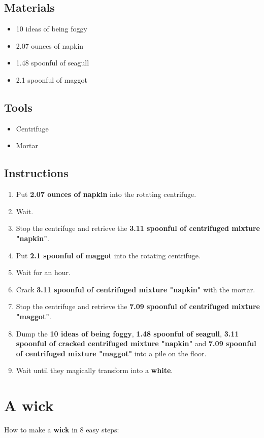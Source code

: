 \documentclass{article}
\begin{document}
\subsection{Materials}\begin{itemize}
\item 
10 ideas of being foggy
\item 
2.07 ounces of napkin
\item 
1.48 spoonful of seagull
\item 
2.1 spoonful of maggot
\end{itemize}
\subsection{Tools}\begin{itemize}
\item 
Centrifuge
\item 
Mortar
\end{itemize}
\subsection{Instructions}\begin{enumerate}
\item 
Put \textbf{2.07 ounces of napkin} into the rotating centrifuge.
\item 
Wait.
\item 
Stop the centrifuge and retrieve the \textbf{3.11 spoonful of centrifuged mixture "napkin"}.
\item 
Put \textbf{2.1 spoonful of maggot} into the rotating centrifuge.
\item 
Wait for an hour.
\item 
Crack \textbf{3.11 spoonful of centrifuged mixture "napkin"} with the mortar.
\item 
Stop the centrifuge and retrieve the \textbf{7.09 spoonful of centrifuged mixture "maggot"}.
\item 
Dump the \textbf{10 ideas of being foggy}, \textbf{1.48 spoonful of seagull}, \textbf{3.11 spoonful of cracked centrifuged mixture "napkin"} and \textbf{7.09 spoonful of centrifuged mixture "maggot"} into a pile on the floor.
\item 
Wait until they magically transform into a \textbf{white}.
\end{enumerate}
\newpage
\section{A wick}How to make a \textbf{wick} in 8 easy steps:
\end{document}
